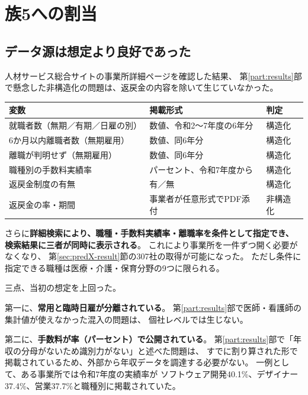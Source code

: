 \section{族5への割当}

\subsection{データ源は想定より良好であった}
\label{sec:jinzai-structure}

人材サービス総合サイトの事業所詳細ページを確認した結果、
第\ref{part:results}部で懸念した非構造化の問題は、返戻金の内容を除いて生じていなかった。

\begin{center}
\begin{tabularx}{\textwidth}{@{}lXl@{}}
\toprule
変数 & 掲載形式 & 判定 \\
\midrule
就職者数（無期／有期／日雇の別） & 数値、令和2〜7年度の6年分 & 構造化 \\
6か月以内離職者数（無期雇用） & 数値、同6年分 & 構造化 \\
離職が判明せず（無期雇用） & 数値、同6年分 & 構造化 \\
職種別の手数料実績率 & パーセント、令和7年度から & 構造化 \\
返戻金制度の有無 & 有／無 & 構造化 \\
返戻金の率・期間 & 事業者が任意形式でPDF添付 & 非構造化 \\
\bottomrule
\end{tabularx}
\label{tab:jinzai-variables}
\end{center}

さらに\textbf{詳細検索により、職種・手数料実績率・離職率を条件として指定でき、
検索結果に三者が同時に表示される}。
これにより事業所を一件ずつ開く必要がなくなり、
第\ref{sec:predX-result}節の307社の取得が可能になった。
ただし条件に指定できる職種は医療・介護・保育分野の9つに限られる。

三点、当初の想定を上回った。

第一に、\textbf{常用と臨時日雇が分離されている}。
第\ref{part:results}部で医師・看護師の集計値が使えなかった混入の問題は、
個社レベルでは生じない。

第二に、\textbf{手数料が率（パーセント）で公開されている}。
第\ref{part:results}部で「年収の分母がないため識別力がない」と述べた問題は、
すでに割り算された形で掲載されているため、外部から年収データを調達する必要がない。
一例として、ある事業所では令和7年度の実績率が
ソフトウェア開発40.1\%、デザイナー37.4\%、営業37.7\%と職種別に掲載されていた。

